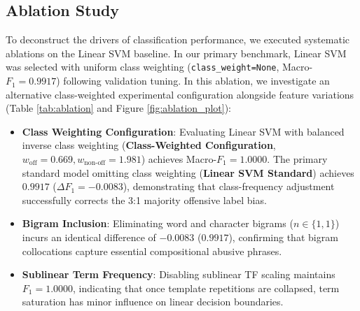 \documentclass[11pt,a4paper]{article}
\begin{document}
\subsection{Ablation Study}
To deconstruct the drivers of classification performance, we executed systematic ablations on the Linear SVM baseline. In our primary benchmark, Linear SVM was selected with uniform class weighting (\texttt{class\_weight=None}, Macro-$F_1 = 0.9917$) following validation tuning. In this ablation, we investigate an alternative class-weighted experimental configuration alongside feature variations (Table \ref{tab:ablation} and Figure \ref{fig:ablation_plot}):
\begin{itemize}
    \item \textbf{Class Weighting Configuration}: Evaluating Linear SVM with balanced inverse class weighting (\textbf{Class-Weighted Configuration}, $w_{\text{off}}=0.669, w_{\text{non-off}}=1.981$) achieves Macro-$F_1 = 1.0000$. The primary standard model omitting class weighting (\textbf{Linear SVM Standard}) achieves $0.9917$ ($\Delta F_1 = -0.0083$), demonstrating that class-frequency adjustment successfully corrects the 3:1 majority offensive label bias.
    \item \textbf{Bigram Inclusion}: Eliminating word and character bigrams ($n \in \{1, 1\}$) incurs an identical difference of $-0.0083$ ($0.9917$), confirming that bigram collocations capture essential compositional abusive phrases.
    \item \textbf{Sublinear Term Frequency}: Disabling sublinear TF scaling maintains $F_1 = 1.0000$, indicating that once template repetitions are collapsed, term saturation has minor influence on linear decision boundaries.
\end{itemize}

\begin{table}[t]
\centering
\small
\caption{\textbf{Systematic feature and preprocessing ablation study on the Linear SVM baseline.}}
\label{tab:ablation}
\end{table}
\end{document}
